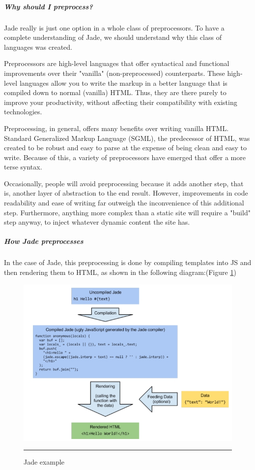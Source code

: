 \subparagraph*{Why should I preprocess?}
\hfill \break
Jade really is just one option in a whole class of preprocessors. To have a complete
understanding of Jade, we should understand why this class of languages was created.\cite{2}


Preprocessors are high-level languages that offer syntactical and functional
improvements over their "vanilla" (non-preprocessed) counterparts. These high-level
languages allow you to write the markup in a better language that is compiled down
to normal (vanilla) HTML. Thus, they are there purely to improve your productivity,
without affecting their compatibility with existing technologies.\cite{2}


Preprocessing, in general, offers many benefits over writing vanilla HTML. Standard
Generalized Markup Language (SGML), the predecessor of HTML, was created to
be robust and easy to parse at the expense of being clean and easy to write. Because
of this, a variety of preprocessors have emerged that offer a more terse syntax.\cite{2}


Occasionally, people will avoid preprocessing because it adds another step, that is,
another layer of abstraction to the end result. However, improvements in code
readability and ease of writing far outweigh the inconvenience of this additional
step. Furthermore, anything more complex than a static site will require a "build"
step anyway, to inject whatever dynamic content the site has.\cite{2}

\subparagraph*{How Jade preprocesses}
\hfill \break
In the case of Jade, this preprocessing is done by compiling templates into JS and
then rendering them to HTML, as shown in the following diagram:(Figure \ref{fig:jade_diagram})
\begin{figure}[h!]
  \centering
    \includegraphics[width=1\textwidth]{./Pictures/jade_diagram.jpg}
  \rule{1\textwidth}{1pt}
 \caption{Jade example}
  \label{fig:jade_diagram}
\end{figure}


